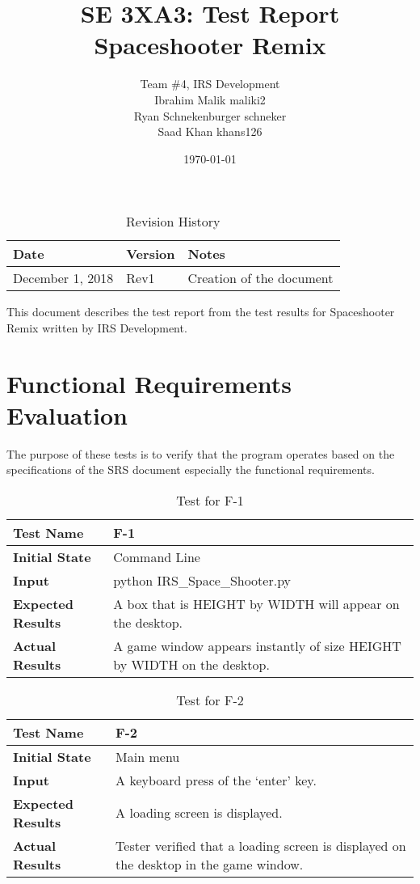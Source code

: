 \documentclass[12pt, titlepage]{article}
\title{SE 3XA3: Test Report\\Spaceshooter Remix}
\author{Team \#4, IRS Development
        \\ Ibrahim Malik maliki2
        \\ Ryan Schnekenburger schneker
        \\ Saad Khan khans126
}
\date{\today}
\begin{document}
\maketitle

\tableofcontents
\listoftables
\listoffigures

\newpage

\begin{table}[hp]
\caption{Revision History} \label{TblRevisionHistory}
\begin{tabularx}{\textwidth}{llX}
\toprule {\bf Date} & {\bf Version} & {\bf Notes}\\
\midrule
December 1, 2018 & Rev1 & Creation of the document\\
\bottomrule
\end{tabularx}
\end{table}

\newpage


\noindent This document describes the test report from the test results for Spaceshooter Remix written by IRS Development.

\section{Functional Requirements Evaluation}

The purpose of these tests is to verify that the program operates based on the specifications of the SRS document especially the functional requirements. 

\begin{table}[!htbp]
\begin{tabular}[r]{|l|l|}\hline
\textbf{Test Name} & F-1 \\ \hline
\textbf{Initial State} &  Command Line \\ \hline
\textbf{Input} & python IRS\_Space\_Shooter.py \\ \hline 
\textbf{Expected Results} & A box that is HEIGHT by WIDTH will appear on the desktop. \\ \hline
\textbf{Actual Results} & A game window appears instantly of size HEIGHT by WIDTH on the desktop.  \\ \hline            
\end{tabular}
\caption{Test for F-1}
\label{Table}
\end{table}

\begin{table}[!htbp]
\begin{tabular}[r]{|l|l|}\hline
\textbf{Test Name} & F-2 \\ \hline
\textbf{Initial State} &   Main menu \\ \hline
\textbf{Input} &A keyboard press of the `enter' key. \\ \hline 
\textbf{Expected Results} &A loading screen is displayed.\\ \hline
\textbf{Actual Results} & Tester verified that a loading screen is displayed  on the desktop in the game window.\\ \hline            
\end{tabular}
\caption{Test for F-2}
\label{Table}
\end{table}
\end{document}
